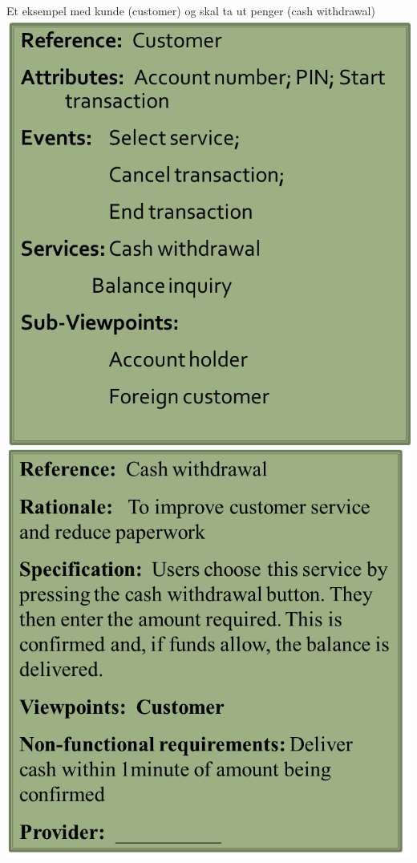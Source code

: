 Et eksempel med kunde (customer) og skal ta ut penger (cash withdrawal)
\includegraphics{Forelesning 08/img/4.png}\includegraphics{Forelesning 08/img/5.png}

